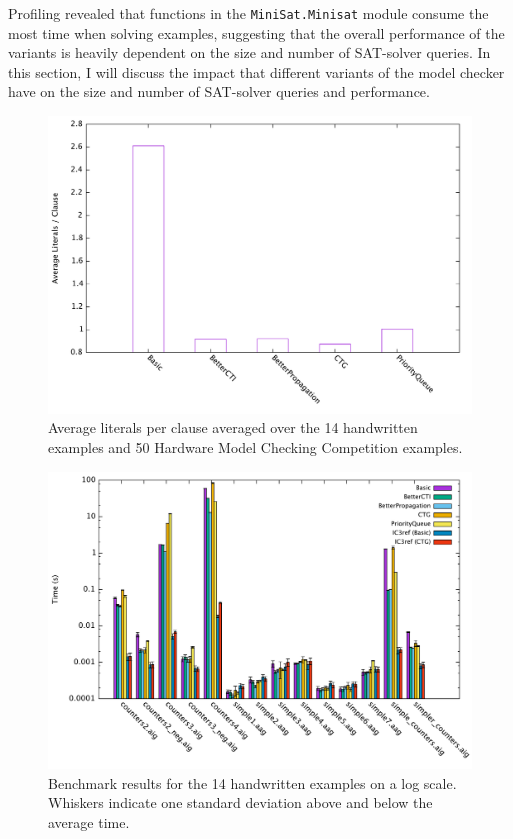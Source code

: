 \documentclass[12pt,a4paper,twoside,openright]{report}
\begin{document}
{{Profiling revealed that functions in the \verb,MiniSat.Minisat, module consume the most time
when solving examples, suggesting that the overall performance of the variants is heavily dependent on
the size and number of SAT-solver queries.
In this section, I will discuss the impact that different
variants of the model checker have on the size and number of SAT-solver queries and performance.

\begin{figure}[t]
\includegraphics[width=16cm]{litspercls.pdf}
\caption{Average literals per clause averaged over the 14 handwritten examples and 50
 Hardware
Model Checking Competition examples.}
\label{eval:lits}
\end{figure}

\begin{figure}[t]
\includegraphics[width=16cm]{handwritten.pdf}
\caption{Benchmark results for the 14 handwritten examples on a log scale. Whiskers
indicate one standard deviation above and below the average time.}
\label{eval:time}
\end{figure}

}}
\end{document}

